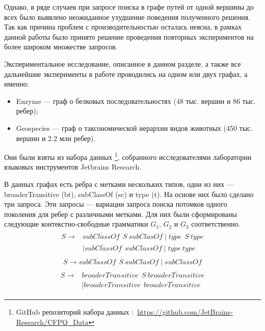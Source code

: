 \documentclass[14pt]{matmex-diploma-custom}
\theoremstyle{definition}
\begin{document}
Однако, в ряде случаев при запросе поиска в графе путей от одной вершины до всех было выявлено неожиданное ухудшение поведения полученного решения. Так как причина проблем с производительностью осталась неясна, в рамках данной работы было принято решение проведения повторных экспериментов на более широком множестве запросов.

Экспериментальное исследование, описанное в данном разделе, а также все дальнейшие эксперименты в работе проводились на одном или двух графах, а именно:
\begin{itemize}
    \item Enzyme --- граф о белковых последовательностях (48 тыс. вершин и 86 тыс. ребер);
    \item Geospecies --- граф о таксономической иерархии видов животных (450 тыс. вершин и 2.2 млн ребер).
\end{itemize}

Они были взяты из набора данных \footnote{GitHub репозиторий набора данных :~\url{https://github.com/JetBrains-Research/CFPQ_Data}}, собранного исследователями лаборатории языковых инструментов Jetbrains Research.

В данных графах есть ребра с метками нескольких типов, одни из них --- broaderTransitive (bt), subClassOf (sc) и type (t).
На основе них было сделано три запроса. Эти запросы --- вариации запроса поиска потомков одного поколения для ребер с различными метками. Для них были сформированы следующие контекстно-свободные грамматики $G_1$, $G_2$ и $G_3$ соответственно.
\begin{align}
\begin{split}
\label{eqn:g_1}
S \to & \overline{\textit{subClassOf}} \ \ S \ \textit{subClasOf} \mid \overline{\textit{type}} \ \ S \ \textit{type}\\   & \mid \overline{\textit{subClassOf}} \ \ \textit{subClassOf} \mid \overline{\textit{type}} \ \textit{type}
\end{split}
\end{align}
\begin{align}
\label{eqn:g_2}
S \to \overline{\textit{subClassOf}} \ \ S \ \textit{subClasOf} \mid \textit{subClassOf}
\end{align}
\begin{align}
\begin{split}
\label{eqn:geo}
S \to & \textit{broaderTransitive} \ \  S \ \overline{\textit{broaderTransitive}} \\
      & \mid \textit{broaderTransitive} \ \  \overline{\textit{broaderTransitive}}
\end{split}
\end{align}
\end{document}
